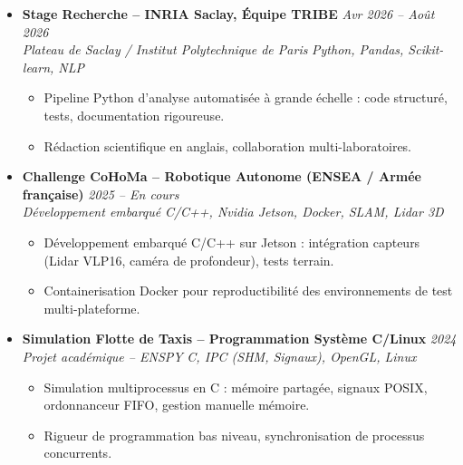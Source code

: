 \documentclass[a4paper,11pt]{article}
\begin{document}
\begin{itemize}[leftmargin=*, label={-}]
\item \textbf{Stage Recherche -- INRIA Saclay, Équipe TRIBE} \hfill \textit{Avr 2026 -- Août 2026} \\
\textit{Plateau de Saclay / Institut Polytechnique de Paris} \hfill \textit{Python, Pandas, Scikit-learn, NLP}
\vspace{-2pt}
    \begin{itemize}[leftmargin=0.4cm, nosep, label=\tiny$\bullet$]
        \item \small{Pipeline Python d'analyse automatisée à grande échelle : code structuré, tests, documentation rigoureuse.}
        \item \small{Rédaction scientifique en anglais, collaboration multi-laboratoires.}
    \end{itemize}
\vspace{3pt}

\item \textbf{Challenge CoHoMa -- Robotique Autonome (ENSEA / Armée française)} \hfill \textit{2025 -- En cours} \\
\textit{Développement embarqué} \hfill \textit{C/C++, Nvidia Jetson, Docker, SLAM, Lidar 3D}
\vspace{-2pt}
    \begin{itemize}[leftmargin=0.4cm, nosep, label=\tiny$\bullet$]
        \item \small{Développement embarqué C/C++ sur Jetson : intégration capteurs (Lidar VLP16, caméra de profondeur), tests terrain.}
        \item \small{Containerisation Docker pour reproductibilité des environnements de test multi-plateforme.}
    \end{itemize}
\vspace{3pt}

\item \textbf{Simulation Flotte de Taxis -- Programmation Système C/Linux} \hfill \textit{2024} \\
\textit{Projet académique -- ENSPY} \hfill \textit{C, IPC (SHM, Signaux), OpenGL, Linux}
\vspace{-2pt}
    \begin{itemize}[leftmargin=0.4cm, nosep, label=\tiny$\bullet$]
        \item \small{Simulation multiprocessus en C : mémoire partagée, signaux POSIX, ordonnanceur FIFO, gestion manuelle mémoire.}
        \item \small{Rigueur de programmation bas niveau, synchronisation de processus concurrents.}
    \end{itemize}
\vspace{3pt}

\end{itemize}
\end{document}
